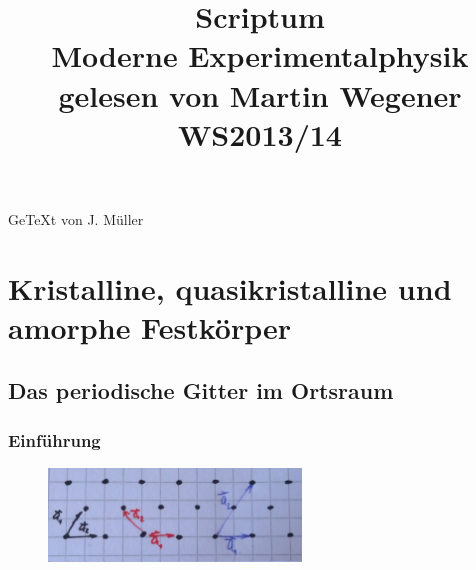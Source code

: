 \documentclass[paper=A4,12pt,pagesize,twoside,BCOR=8mm,ngerman]{scrartcl}
\title{\textnormal{Scriptum}\\ Moderne Experimentalphysik \uppercase\expandafter{\romannumeral2\relax}\\\textnormal{\large{gelesen von Martin Wegener WS2013/14}}}
\author{}
\date{}
\begin{document}
\maketitle
\vfill
\begin{center}
	\large{Ge\TeX t von J. Müller}
\end{center}
\setcounter{page}{0} 
\thispagestyle{empty}
\newpage
\tableofcontents
\newpage
{}
\section{Kristalline, quasikristalline und amorphe Festkörper}
	\subsection{Das periodische Gitter im Ortsraum}
		\subsubsection{Einführung}
			\begin{figure}[H]
				\centering
				\includegraphics[width=0.6\textwidth]{pics/pic001.jpg}
			\end{figure}
					
\end{document}
